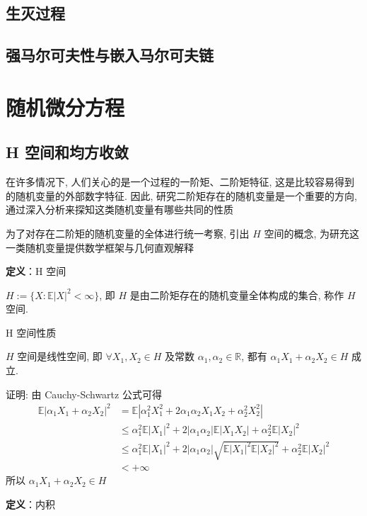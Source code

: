\documentclass[openany]{ctexbook}
\theoremstyle{kaiti}
\theoremstyle{normal}
\begin{document}
\section{生灭过程}

\section{强马尔可夫性与嵌入马尔可夫链}

\chapter{随机微分方程}

\section{H 空间和均方收敛}

在许多情况下, 人们关心的是一个过程的一阶矩、二阶矩特征, 这是比较容易得到的随机变量的外部数字特征. 因此, 研究二阶矩存在的随机变量是一个重要的方向, 通过深入分析来探知这类随机变量有哪些共同的性质

为了对存在二阶矩的随机变量的全体进行统一考察, 引出 $H$ 空间的概念, 为研充这一类随机变量提供数学框架与几何直观解释

\textbf{定义}：H 空间

$H:=\{X:\mathbb{E}|X|^2<\infty\}$, 即 $H$ 是由二阶矩存在的随机变量全体构成的集合, 称作 $H$ 空间.

H 空间性质

$H$ 空间是线性空间, 即 $\forall X_1,X_2\in H$ 及常数 $\alpha_1,\alpha_2\in\mathbb{R}$, 都有 $\alpha_1X_1+\alpha_2X_2\in H$ 成立.

证明: 由 Cauchy-Schwartz 公式可得
\begin{equation}
  \begin{aligned}
    \mathbb{E}|\alpha_1X_1+\alpha_2X_2|^2&=\mathbb{E}|\alpha_1^2X_1^2+2\alpha_1\alpha_2X_1X_2+\alpha_2^2X_2^2|\\
    &\leqslant \alpha_1^2\mathbb{E}|X_1|^2+2|\alpha_1\alpha_2|\mathbb{E}|X_1X_2|+\alpha_2^2\mathbb{E}|X_2|^2\\
    &\leqslant\alpha_1^2\mathbb{E}|X_1|^2+2|\alpha_1\alpha_2|\sqrt{\mathbb{E}|X_1|^2\mathbb{E}|X_2|^2}+\alpha_2^2\mathbb{E}|X_2|^2\\
    &<+\infty
  \end{aligned}
\end{equation} 所以 $\alpha_1X_1+\alpha_2X_2\in H$

\textbf{定义}：内积
\end{document}
